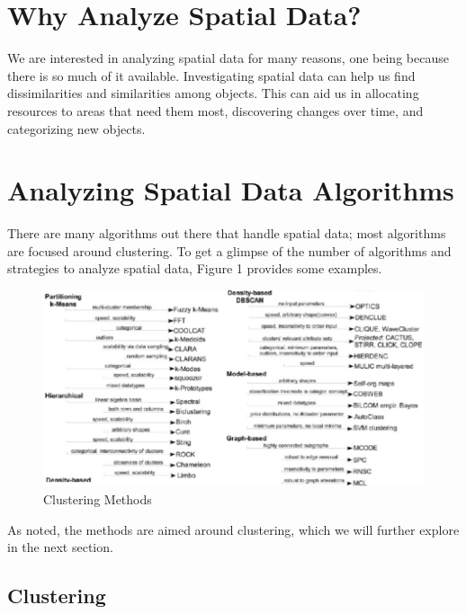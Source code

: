 \documentclass[12pt,twoside]{amherstthesis}
\begin{document}
  \section{Why Analyze Spatial Data?}\label{why-analyze-spatial-data}
  
  We are interested in analyzing spatial data for many reasons, one being
  because there is so much of it available. Investigating spatial data can
  help us find dissimilarities and similarities among objects. This can
  aid us in allocating resources to areas that need them most, discovering
  changes over time, and categorizing new objects.
  
  \section{Analyzing Spatial Data
  Algorithms}\label{analyzing-spatial-data-algorithms}
  
  There are many algorithms out there that handle spatial data; most
  algorithms are focused around clustering. To get a glimpse of the number
  of algorithms and strategies to analyze spatial data, Figure 1 provides
  some examples.
  
  \begin{figure}[htbp]
  \centering
  \includegraphics[scale = 0.5,angle = 0]{clustering_methods.png}
  \caption[Clustering Methods]{\normalsize{Clustering Methods}}
  \label{fig:Clustering}
  \end{figure}
  
  As noted, the methods are aimed around clustering, which we will further
  explore in the next section.
  
  \subsection{Clustering}\label{clustering}
  
\end{document}
